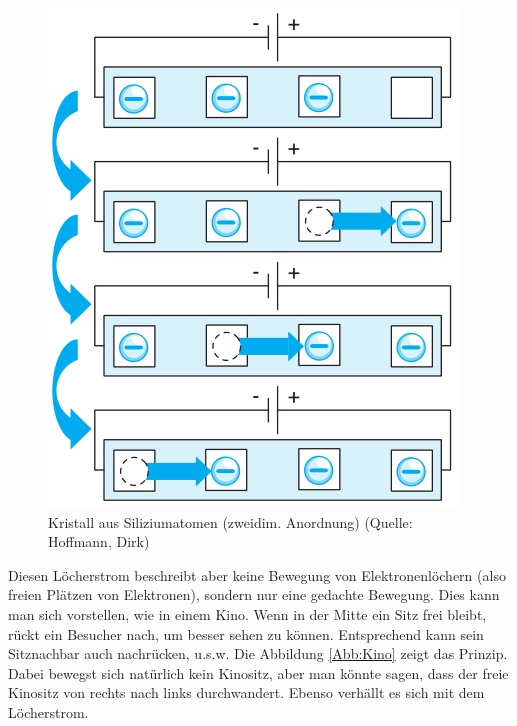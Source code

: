\begin{figure}[htp]
\begin{center}
\includegraphics[scale=.7]{pics/Loecherstrom}
\caption{Kristall aus Siliziumatomen (zweidim. Anordnung) (Quelle: Hoffmann, Dirk)}
\label{Abb:Loecher}
\end{center}
\end{figure}

Diesen Löcherstrom beschreibt aber keine Bewegung von Elektronenlöchern (also freien Plätzen von Elektronen), sondern nur eine gedachte Bewegung.
Dies kann man sich vorstellen, wie in einem Kino.
Wenn in der Mitte ein Sitz frei bleibt, rückt ein Besucher nach, um besser sehen zu können.
Entsprechend kann sein Sitznachbar auch nachrücken, u.s.w.
Die Abbildung \ref{Abb:Kino} zeigt das Prinzip.
Dabei bewegst sich natürlich kein Kinositz, aber man könnte sagen, dass der freie Kinositz von rechts nach links durchwandert.
Ebenso verhällt es sich mit dem Löcherstrom.


